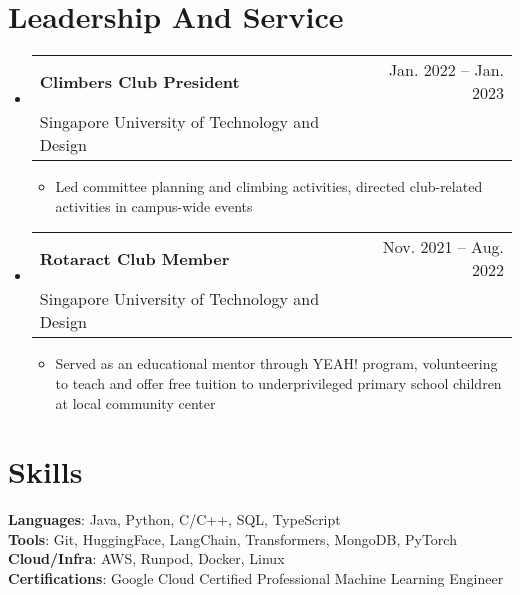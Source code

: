 \documentclass[letterpaper,11pt]{article}
\makeatletter
\newcommand{\resumeItem}[1]{
  \item\small{
    {#1 \vspace{-2pt}}
  }
}
\newcommand{\resumeSubheading}[4]{
  \vspace{-2pt}\item
    \begin{tabular*}{0.97\textwidth}[t]{l@{\extracolsep{\fill}}r}
      \textbf{#1} & #2 \\
      \textnormal{\small#3} & \textnormal{\small #4} \\
    \end{tabular*}\vspace{-7pt}
}
\newcommand{\resumeSubHeadingListStart}{\begin{itemize}[leftmargin=0.15in, label={}]}
\newcommand{\resumeSubHeadingListEnd}{\end{itemize}}
\newcommand{\resumeItemListStart}{\begin{itemize}}
\newcommand{\resumeItemListEnd}{\end{itemize}\vspace{-5pt}}
\makeatother
\begin{document}
\section{Leadership And Service}
  \resumeSubHeadingListStart
    \resumeSubheading
      {Climbers Club President }{Jan. 2022  -- Jan. 2023}
      {Singapore University of Technology and Design}{}
      \resumeItemListStart
        \resumeItem{Led committee planning and climbing activities, directed club-related activities in campus-wide events}
      \resumeItemListEnd
    \resumeSubheading
      {Rotaract Club Member}{Nov. 2021  -- Aug. 2022}
      {Singapore University of Technology and Design}{}
      \resumeItemListStart
        \resumeItem{Served as an educational mentor through YEAH! program, volunteering to teach and offer free tuition to underprivileged primary school children at local community center}
      \resumeItemListEnd
  \resumeSubHeadingListEnd
%

\section{Skills}
 \begin{itemize}[leftmargin=0.15in, label={}]
    \small{\item{
     \textbf{Languages}{: Java, Python, C/C++, SQL, TypeScript} \\
     \textbf{Tools}{: Git, HuggingFace, LangChain, Transformers, MongoDB, PyTorch} \\
     \textbf{Cloud/Infra}{: AWS, Runpod, Docker, Linux} \\
     \textbf{Certifications}{: Google Cloud Certified Professional Machine Learning Engineer}
    }}
 \end{itemize}

\end{document}
